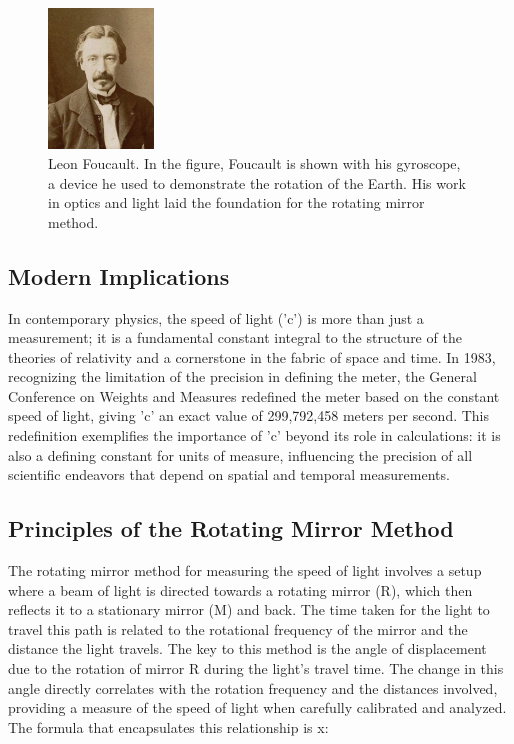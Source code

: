 \documentclass[12pt]{article}
\begin{document}
        \begin{figure}[!h]
                \centering
                \includegraphics[width=0.25\textwidth]{../Imgs/leon.jpeg}
                \caption{Leon Foucault. In the figure, Foucault is shown with his gyroscope,
                a device he used to demonstrate the rotation of the Earth. His work in optics
                and light laid the foundation for the rotating mirror method.}
                \label{fig: Leon Foucault}
        \end{figure}
        
        \subsection{Modern Implications}
        In contemporary physics, the speed of light ('c') is more than just a measurement; 
        it is a fundamental constant integral to the structure of the theories of relativity 
        and a cornerstone in the fabric of space and time. In 1983, recognizing the limitation 
        of the precision in defining the meter, the General Conference on Weights and Measures 
        redefined the meter based on the constant speed of light, giving 'c' an exact value of 
        299,792,458 meters per second. This redefinition exemplifies the importance of 'c' 
        beyond its role in calculations: it is also a defining constant for units of measure, 
        influencing the precision of all scientific endeavors that depend on spatial and temporal 
        measurements.

        \subsection{Principles of the Rotating Mirror Method}
        The rotating mirror method for measuring the speed of light involves a setup where a beam 
        of light is directed towards a rotating mirror (R), which then reflects it to a stationary 
        mirror (M) and back. The time taken for the light to travel this path is related to the 
        rotational frequency of the mirror and the distance the light travels. The key to this 
        method is the angle of displacement due to the rotation of mirror R during the light's 
        travel time. The change in this angle directly correlates with the rotation frequency 
        and the distances involved, providing a measure of the speed of light when carefully 
        calibrated and analyzed. The formula that encapsulates this relationship is x:
\end{document}
